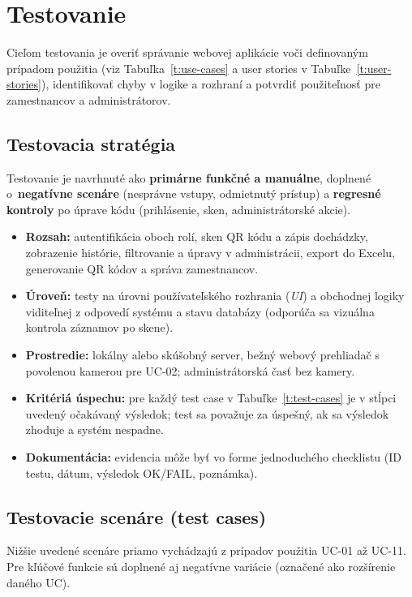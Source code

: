 \section{Testovanie}

Cieľom testovania je overiť správanie webovej aplikácie voči definovaným prípadom použitia
(viz Tabuľka~\ref{t:use-cases} a user stories v Tabuľke~\ref{t:user-stories}), identifikovať chyby v logike
a rozhraní a potvrdiť použiteľnosť pre zamestnancov a administrátorov.

\subsection{Testovacia stratégia}

Testovanie je navrhnuté ako \textbf{primárne funkčné a manuálne}, doplnené o~\textbf{negatívne scenáre}
(nesprávne vstupy, odmietnutý prístup) a \textbf{regresné kontroly} po úprave kódu (prihlásenie, sken,
administrátorské akcie).

\begin{itemize}
  \item \textbf{Rozsah:} autentifikácia oboch rolí, sken QR kódu a zápis dochádzky, zobrazenie histórie,
  filtrovanie a úpravy v administrácii, export do Excelu, generovanie QR kódov a správa zamestnancov.
  \item \textbf{Úroveň:} testy na úrovni používateľského rozhrania (\textit{UI}) a obchodnej logiky
  viditeľnej z odpovedí systému a stavu databázy (odporúča sa vizuálna kontrola záznamov po skene).
  \item \textbf{Prostredie:} lokálny alebo skúšobný server, bežný webový prehliadač s povolenou kamerou
  pre UC-02; administrátorská časť bez kamery.
  \item \textbf{Kritériá úspechu:} pre každý test case v Tabuľke~\ref{t:test-cases} je v stĺpci uvedený
  očakávaný výsledok; test sa považuje za úspešný, ak sa výsledok zhoduje a systém nespadne.
  \item \textbf{Dokumentácia:} evidencia môže byť vo forme jednoduchého checklistu (ID testu, dátum, výsledok OK/FAIL, poznámka).
\end{itemize}

\subsection{Testovacie scenáre (test cases)}

Nižšie uvedené scenáre priamo vychádzajú z prípadov použitia UC-01 až UC-11. Pre kľúčové funkcie sú doplnené
aj negatívne variácie (označené ako rozšírenie daného UC).

